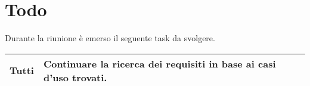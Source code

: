 \section{Todo}
Durante la riunione è emerso il seguente task da svolgere.

\begin{center}
  \begin{tabular}{|p{5cm}|p{7cm}|}
    \hline
    Tutti & Continuare la ricerca dei requisiti in base ai casi d'uso trovati. \\ \hline
  \end{tabular}
\end{center}
